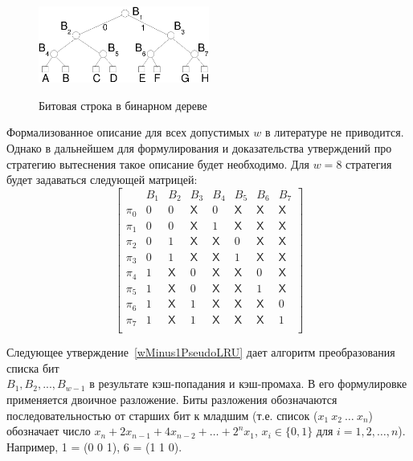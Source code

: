\begin{figure}[h] \center
  \includegraphics[width=0.5\textwidth]{1.review/plru}\\
  \caption{Битовая строка в бинарном дереве}\label{plru_bittree}
\end{figure}

Формализованное описание для всех допустимых $w$ в литературе не
приводится. Однако в дальнейшем для формулирования и доказательства
утверждений про стратегию вытеснения \PseudoLRU такое описание будет
необходимо. Для $w=8$ стратегия будет задаваться следующей матрицей:
$$
\left[
  \begin{array}{c|ccccccc}
          & B_1 & B_2 & B_3 & B_4 & B_5 & B_6 & B_7 \\ \hline
    \pi_0 & 0 & 0 & \textsf{X} & 0 & \textsf{X} & \textsf{X} & \textsf{X} \\
    \pi_1 & 0 & 0 & \textsf{X} & 1 & \textsf{X} & \textsf{X} & \textsf{X} \\
    \pi_2 & 0 & 1 & \textsf{X} & \textsf{X} & 0 & \textsf{X} & \textsf{X} \\
    \pi_3 & 0 & 1 & \textsf{X} & \textsf{X} & 1 & \textsf{X} & \textsf{X} \\
    \pi_4 & 1 & \textsf{X} & 0 & \textsf{X} & \textsf{X} & 0 & \textsf{X} \\
    \pi_5 & 1 & \textsf{X} & 0 & \textsf{X} & \textsf{X} & 1 & \textsf{X} \\
    \pi_6 & 1 & \textsf{X} & 1 & \textsf{X} & \textsf{X} & \textsf{X} & 0 \\
    \pi_7 & 1 & \textsf{X} & 1 & \textsf{X} & \textsf{X} & \textsf{X} & 1 \\
  \end{array}
\right]
$$

Следующее утверждение~\ref{wMinus1PseudoLRU} дает алгоритм
преобразования списка бит\\ $B_1, B_2, ..., B_{w{-}1}$ в результате
кэш-попадания и кэш-промаха. В его формулировке применяется двоичное
разложение. Биты разложения обозначаются последовательностью от
старших бит к младшим (т.е. список ($x_1~x_2~\dots~x_n$) обозначает
число $x_n + 2x_{n-1} + 4x_{n-2} + \dots + 2^n x_1$, $x_i \in \{0,
1\}$ для $i = 1, 2, \dots, n$). Например, 1 = (0 0 1), 6 = (1 1 0).

